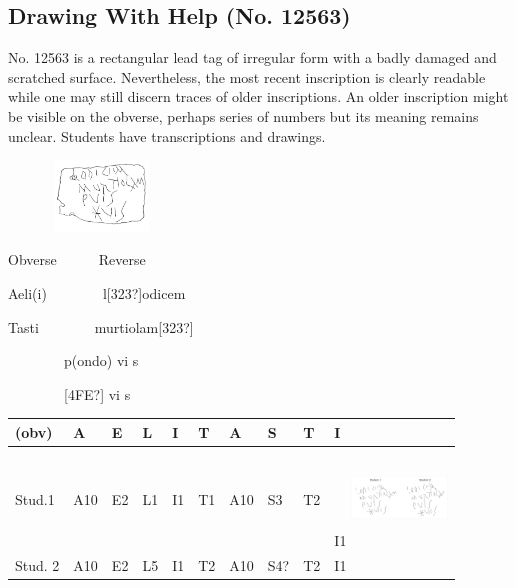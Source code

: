 \documentclass[amsthm,ebook]{saparticle}
\begin{document}
\subsection{Drawing With Help (No. 12563)}


\begin{figure}

\end{figure}
No. 12563 is a rectangular lead tag of irregular form with a badly damaged and scratched surface. Nevertheless, the most
recent inscription is clearly readable while one may still discern traces of older inscriptions. An older inscription
might be visible on the obverse, perhaps series of numbers but its meaning remains unclear. Students have
transcriptions and drawings.

\begin{figure}
\centering
\includegraphics[width=2.845cm,height=1.896cm]{EAGLE16lameetalteaching-img007.png}
\end{figure}
Obverse\ \ \ \ \ \ Reverse

Aeli(i)\ \ \ \ \ \ \ \ l[323?]odicem

Tasti\ \ \ \ \ \ \ \ murtiolam[323?]

\ \ \ \ \ \ \ \ p(ondo) vi s

\ \ \ \ \ \ \ \ [4FE?] vi s

\begin{flushleft}
\tablefirsthead{}
\tablehead{}
\tabletail{}
\tablelasttail{}
\begin{supertabular}{|m{1.4399999cm}|m{0.518cm}|m{0.37700003cm}|m{0.361cm}|m{0.297cm}|m{0.361cm}|m{0.518cm}|m{0.486cm}|m{0.361cm}|m{0.30300003cm}|}
\hline
{} (obv) &
A &
E &
L &
I &
T &
A &
S &
T &
I\\\hline
\centering Stud.1 &
A10 &
E2 &
L1 &
I1 &
T1 &
A10 &
S3 &
T2 &
I1\centering
\includegraphics[width=2.563cm,height=2.579cm]{EAGLE16lameetalteaching-img008.png}
\\\hline
\centering Stud. 2 &
A10 &
E2 &
L5 &
I1 &
T2 &
A10 &
S4? &
T2 &
I1\\\hline
\end{supertabular}
\end{flushleft}
\end{document}
